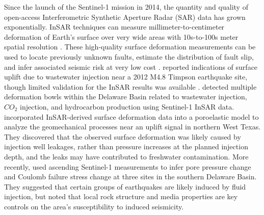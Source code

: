 Since the launch of the Sentinel-1 mission in 2014, the quantity and quality of open-access Interferometric Synthetic Aperture Radar (SAR) data has grown exponentially. InSAR techniques can measure millimeter-to-centimeter deformation of Earth's surface over very wide areas with 10s-to-100s meter spatial resolution \citep{Massonnet1993DisplacementFieldLanders, Buergmann2000SyntheticApertureRadar}. These high-quality surface deformation measurements can be used to locate previously unknown faults, estimate the distribution of fault slip, and infer associated seismic risk at very low cost \citep{Segall2010EarthquakeVolcanoDeformation, Elliott2016RoleSpaceBased, Huang2017FaultGeometryInversion}. \cite{Shirzaei2016SurfaceUpliftTime} reported indications of surface uplift due to wastewater injection near a 2012 M4.8 Timpson earthquake site, though limited validation for the InSAR results was available \citep{Semple2017IncompleteInventorySuspected}.
\cite{Kim2018AssociationLocalizedGeohazards} detected multiple deformation bowls within the Delaware Basin related to wastewater injection, $CO_2$ injection, and hydrocarbon production using Sentinel-1 InSAR data. \cite{Zheng2019WastewaterLeakageWest} incorporated InSAR-derived surface deformation data into a poroelastic model to analyze the geomechanical processes near an uplift signal in northern West Texas. They discovered that the observed surface deformation was likely caused by injection well leakages, rather than pressure increases at the planned injection depth, and the leaks may have contributed to freshwater contamination. More recently, \cite{Deng2020SurfaceDeformationInduced} used ascending Sentinel-1 measurements to infer pore pressure change and Coulomb failure stress change at three sites in the southern Delaware Basin. They suggested that certain groups of earthquakes are likely induced by fluid injection, but noted that local rock structure and media properties are key controls on the area's susceptibility to induced seismicity.



